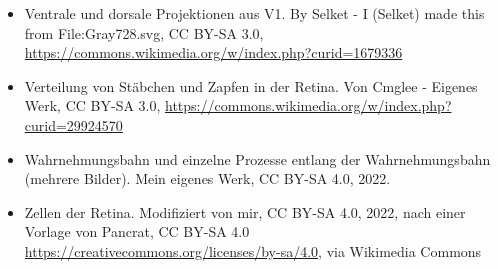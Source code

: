 \documentclass{beamer}
\begin{document}
\begin{frame}
\begin{tiny}
\begin{itemize}
\item
Ventrale und dorsale Projektionen aus V1. By Selket - I (Selket) made this from File:Gray728.svg, CC BY-SA 3.0, \url{https://commons.wikimedia.org/w/index.php?curid=1679336}

\item
Verteilung von Stäbchen und Zapfen in der Retina. Von Cmglee - Eigenes Werk, CC BY-SA 3.0, \url{https://commons.wikimedia.org/w/index.php?curid=29924570}

\item
Wahrnehmungsbahn und einzelne Prozesse entlang der Wahrnehmungsbahn (mehrere Bilder). Mein eigenes Werk, CC BY-SA 4.0, 2022. 

\item
Zellen der Retina. Modifiziert von mir, CC BY-SA 4.0, 2022, nach einer Vorlage von  Pancrat, CC BY-SA 4.0 \url{https://creativecommons.org/licenses/by-sa/4.0}, via Wikimedia Commons

\end{itemize}
\end{tiny}
\end{frame}
\end{document}
